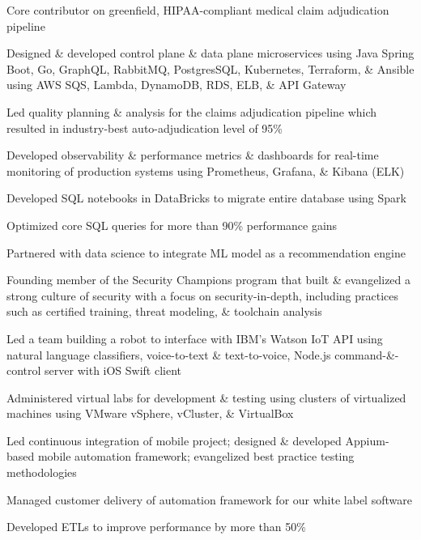 \documentclass[]{resume}
\begin{document}
\begin{minipage}[t]{0.55\textwidth}
\begin{tightemize}
\item Core contributor on greenfield, HIPAA-compliant medical claim adjudication pipeline 
\item Designed \& developed control plane \& data plane microservices using Java Spring Boot, Go, GraphQL, RabbitMQ, PostgresSQL, Kubernetes, Terraform, \& Ansible using AWS SQS, Lambda, DynamoDB, RDS, ELB, \& API Gateway  
\item Led quality planning \& analysis for the claims adjudication pipeline which resulted in industry-best auto-adjudication level of 95\%
\item Developed observability \& performance metrics \& dashboards for real-time monitoring of production systems using Prometheus, Grafana, \& Kibana (ELK)
\item Developed SQL notebooks in DataBricks to migrate entire database using Spark 
\item Optimized core SQL queries for more than 90\% performance gains
\item Partnered with data science to integrate ML model as a recommendation engine
\item Founding member of the Security Champions program that built \& evangelized a strong culture of security with a focus on security-in-depth, including practices such as certified training, threat modeling, \& toolchain analysis
\end{tightemize}
\sectionsep 


\begin{tightemize}
\item Led a team building a robot to interface with IBM's Watson IoT API using natural language classifiers, voice-to-text \& text-to-voice, Node.js command-\&-control server with iOS Swift client
\item Administered virtual labs for development \& testing using clusters of virtualized machines using VMware vSphere, vCluster, \& VirtualBox
\item Led continuous integration of mobile project; designed \& developed Appium-based mobile automation framework; evangelized best practice testing methodologies 
\item Managed customer delivery of automation framework for our white label software
\item Developed ETLs to improve performance by more than 50\%
\end{tightemize}
\sectionsep


\end{minipage}
\end{document}
